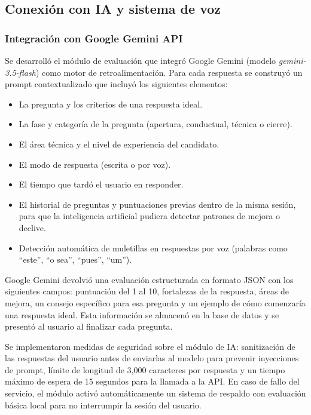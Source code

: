 \subsection{Conexión con IA y sistema de voz}

\subsubsection{Integración con Google Gemini API}

Se desarrolló el módulo de evaluación que integró Google Gemini
(modelo \textit{gemini-3.5-flash}) como motor de retroalimentación.
Para cada respuesta se construyó un prompt contextualizado que
incluyó los siguientes elementos:

\begin{itemize}
    \item La pregunta y los criterios de una respuesta ideal.
    \item La fase y categoría de la pregunta (apertura, conductual,
    técnica o cierre).
    \item El área técnica y el nivel de experiencia del candidato.
    \item El modo de respuesta (escrita o por voz).
    \item El tiempo que tardó el usuario en responder.
    \item El historial de preguntas y puntuaciones previas dentro
    de la misma sesión, para que la inteligencia artificial pudiera
    detectar patrones de mejora o declive.
    \item Detección automática de muletillas en respuestas por voz
    (palabras como ``este'', ``o sea'', ``pues'', ``um'').
\end{itemize}

Google Gemini devolvió una evaluación estructurada en formato JSON
con los siguientes campos: puntuación del 1 al 10, fortalezas de
la respuesta, áreas de mejora, un consejo específico para esa
pregunta y un ejemplo de cómo comenzaría una respuesta ideal. Esta
información se almacenó en la base de datos y se presentó al usuario
al finalizar cada pregunta.

Se implementaron medidas de seguridad sobre el módulo de IA:
sanitización de las respuestas del usuario antes de enviarlas al
modelo para prevenir inyecciones de prompt, límite de longitud de
3{,}000 caracteres por respuesta y un tiempo máximo de espera de 15
segundos para la llamada a la API. En caso de fallo del servicio,
el módulo activó automáticamente un sistema de respaldo con
evaluación básica local para no interrumpir la sesión del usuario.

